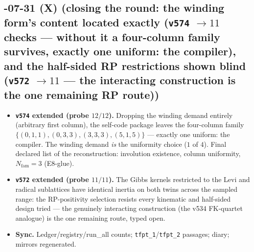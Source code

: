 \documentclass[11pt]{article}
\begin{document}
\subsection*{-07-31 (X) (closing the round: the winding form's content located exactly (\texttt{v574} $\to11$ checks --- without it a four-column family survives, exactly one uniform: the compiler), and the half-sided RP restrictions shown blind (\texttt{v572} $\to11$ --- the interacting construction is the one remaining RP route))}
\begin{itemize}[leftmargin=1.5em]
\item \textbf{\texttt{v574} extended (probe $12/12$).} Dropping the winding demand entirely
(arbitrary first column), the self-code package leaves the four-column family
$\{(0,1,1),(0,3,3),(3,3,3),(5,1,5)\}$ --- exactly one uniform: the compiler.  The winding
demand \emph{is} the uniformity choice ($1$ of $4$).  Final declared list of the
reconstruction: involution existence, column uniformity, $N_{\mathrm{fam}}=3$ (E8-glue).
\item \textbf{\texttt{v572} extended (probe $11/11$).} The Gibbs kernels restricted to the
Levi and radical sublattices have identical inertia on both twins across the sampled range:
the RP-positivity selection resists every kinematic and half-sided design tried --- the
genuinely interacting construction (the v534 FK-quartet analogue) is the one remaining route,
typed open.
\item \textbf{Sync.} Ledger/registry/run\_all counts; \texttt{tfpt\_1}/\texttt{tfpt\_2}
passages; diary; mirrors regenerated.
\end{itemize}
\end{document}
